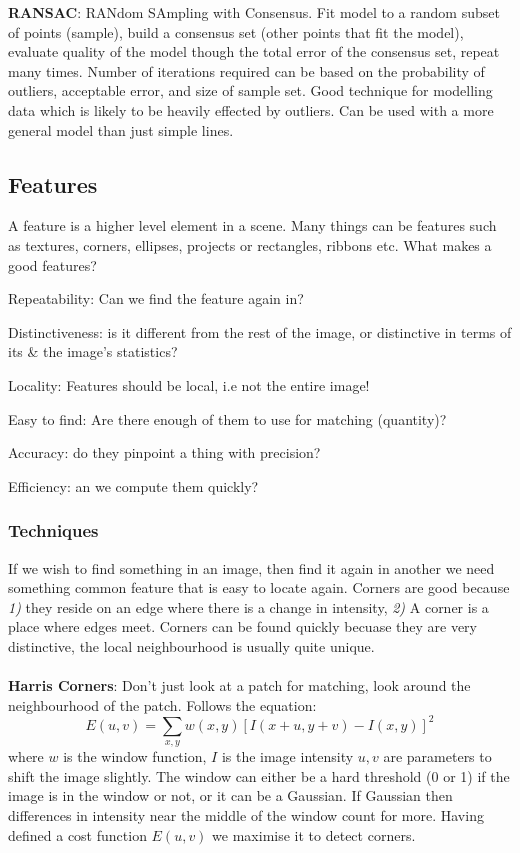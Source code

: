 \documentclass[8pt]{extarticle}
\begin{document}
\begin{multicols}{2}
\textbf{RANSAC}: RANdom SAmpling with Consensus. Fit model to a random subset of points (sample), build a consensus set (other points that fit the model), evaluate quality of the model though the total error of the consensus set, repeat many times. Number of iterations required can be based on the probability of outliers, acceptable error, and size of sample set. Good technique for modelling data which is likely to be heavily effected by outliers. Can be used with a more general model than just simple lines.

\subsection{Features}
A feature is a higher level element in a scene. Many things can be features such as textures, corners, ellipses, projects or rectangles, ribbons etc. What makes a good features?
\begin{compactitem}
    \item Repeatability: Can we find the feature again in?
    \item Distinctiveness: is it different from the rest of the image, or distinctive in terms of its \& the image's statistics?
    \item Locality: Features should be local, i.e not the entire image!
    \item Easy to find: Are there enough of them to use for matching (quantity)?
    \item Accuracy: do they pinpoint a thing with precision?
    \item Efficiency: an we compute them quickly?
\end{compactitem}

\subsubsection{Techniques}
If we wish to find something in an image, then find it again in another we need something common feature that is easy to locate again. Corners are good because \textit{1)} they reside on an edge where there is a change in intensity, \textit{2)} A corner is a place where edges meet. Corners can be found quickly becuase they are very distinctive, the local neighbourhood is usually quite unique.
\\ \\
\textbf{Harris Corners}: Don't just look at a patch for matching, look around the neighbourhood of the patch. Follows the equation:
\begin{equation}
    E(u,v) = \sum\limits_{x,y} w(x,y)[I(x+u, y+v) - I(x,y)]^2
\end{equation}
where $w$ is the window function, $I$ is the image intensity $u,v$ are parameters to shift the image slightly. The window can either be a hard threshold (0 or 1) if the image is in the window or not, or it can be a Gaussian. If Gaussian then differences in intensity near the middle of the window count for more. Having defined a cost function $E(u,v)$ we maximise it to detect corners.


\end{multicols}
\end{document}
